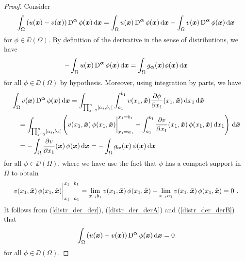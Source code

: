 \begin{proof}
Consider
\begin{equation} \label{distr_der_der}
\int_\Omega \left(u({\bm{x}}) - v({\bm{x}})\right) \operatorname{D}^{{\bm{\alpha}}}
\phi({\bm{x}}) \,\mathrm{d}{{\bm{x}}}
= \int_\Omega u({\bm{x}}) \operatorname{D}^{{\bm{\alpha}}} \phi({\bm{x}}) \,\mathrm{d}{{\bm{x}}} -
\int_\Omega v({\bm{x}}) \operatorname{D}^{{\bm{\alpha}}} \phi({\bm{x}}) \,\mathrm{d}{{\bm{x}}}
\end{equation}
for $\phi \in \DD(\Omega)$.
By definition of the derivative in the sense of distributions, we have
\begin{equation} \label{distr_der_derA}
-\int_\Omega u({\bm{x}}) \operatorname{D}^{{\bm{\alpha}}} \phi({\bm{x}}) \,\mathrm{d}{{\bm{x}}} =
\int_\Omega g_{{\bm{\alpha}}}({\bm{x}}) \phi({\bm{x}}) \,\mathrm{d}{{\bm{x}}}
\end{equation}
for all $\phi \in \DD(\Omega)$ by hypothesis.
Moreover, using integration by parts, we have
\begin{align}
&\int_\Omega v({\bm{x}}) \operatorname{D}^{{\bm{\alpha}}} \phi({\bm{x}}) \,\mathrm{d}{{\bm{x}}} =
\int_{\prod_{j=2}^n]a_j,b_j[} \int_{a_1}^{b_1}
v(x_1,\tilde{{\bm{x}}}) \frac{\partial{\phi}}{\partial x_1}(x_1,\tilde{{\bm{x}}})
\,\mathrm{d}{x_1} \,\mathrm{d}{\tilde{{\bm{x}}}} \nonumber \\
&\quad = \int_{\prod_{j=2}^n]a_j,b_j[} \left( v(x_1, \tilde{{\bm{x}}})\,
\phi(x_1,\tilde{{\bm{x}}})\bigg|_{x_1=a_1}^{x_1=b_1}
- \int_{a_1}^{b_1} \frac{\partial{v}}{\partial x_1}(x_1,\tilde{{\bm{x}}})\,
\phi(x_1,\tilde{{\bm{x}}}) \,\mathrm{d}{x_1} \right) \,\mathrm{d}{\tilde{{\bm{x}}}}
\nonumber \\
&\quad = - \int_\Omega \frac{\partial{v}}{\partial x_1}({\bm{x}})\,\phi({\bm{x}}) \,\mathrm{d}{{\bm{x}}}
= - \int_\Omega g_{{\bm{\alpha}}}({\bm{x}})\,\phi({\bm{x}}) \,\mathrm{d}{{\bm{x}}}
\label{distr_der_derB}
\end{align}
for all $\phi \in \DD(\Omega)$, where we have use the fact that $\phi$
has a compact support in $\Omega$ to obtain
\[
v(x_1,\tilde{{\bm{x}}})\, \phi(x_1,\tilde{{\bm{x}}})
\bigg|_{x_1=a_1}^{x_1=b_1}
= \lim_{x_ \to b_1} v(x_1,\tilde{{\bm{x}}})\, \phi(x_1,\tilde{{\bm{x}}})
- \lim_{x_ \to a_1} v(x_1,\tilde{{\bm{x}}})\, \phi(x_1,\tilde{{\bm{x}}}) = 0 \ .
\]
It follows from (\ref{distr_der_der}), (\ref{distr_der_derA}) and
(\ref{distr_der_derB}) that
\begin{equation} \label{distr_der_der2}
\int_\Omega \left(u({\bm{x}}) - v({\bm{x}})\right) \operatorname{D}^{{\bm{\alpha}}}
\phi({\bm{x}}) \,\mathrm{d}{{\bm{x}}} = 0
\end{equation}
for all $\phi \in \DD(\Omega)$.


\end{proof}
